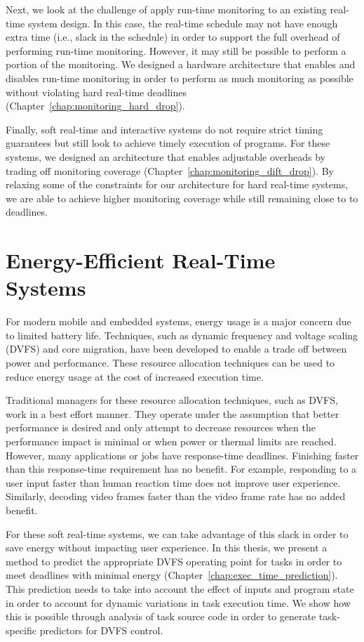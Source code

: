 Next, we look at the challenge of apply run-time monitoring to an existing
real-time system design. In this case, the real-time schedule may not have
enough extra time (i.e., slack in the schedule) in order to support the
full overhead of performing run-time monitoring. However, it may still be possible
to perform a portion of the monitoring. We designed a hardware architecture
that enables and disables run-time monitoring in order to perform as much
monitoring as possible without violating hard real-time deadlines
(Chapter~\ref{chap:monitoring_hard_drop}).

Finally, soft real-time and interactive systems do not require strict timing guarantees
but still look to achieve timely execution of programs. For these systems, we designed an
architecture that enables adjustable overheads by trading off monitoring coverage
(Chapter~\ref{chap:monitoring_dift_drop}). By relaxing some of the constraints
for our architecture for hard real-time systems, we are able to achieve higher
monitoring coverage while still remaining close to to deadlines.

\section{Energy-Efficient Real-Time Systems}
\label{sec:intro.energy}

For modern mobile and embedded systems, energy usage is a major concern due to
limited battery life. Techniques, such as dynamic frequency and voltage scaling
(DVFS) and core migration, have been developed to enable a trade off
between power and performance. These resource allocation techniques can be used
to reduce energy usage at the cost of increased execution time.

Traditional managers for these resource allocation techniques, such as DVFS,
work in a best effort manner. They operate under the assumption that better
performance is desired and only attempt to decrease resources when the
performance impact is minimal or when power or thermal limits are reached.
However, many applications or jobs have
response-time deadlines. Finishing faster than this response-time
requirement has no benefit. For example, responding to a user input faster than
human reaction time does not improve user experience. Similarly, decoding video
frames faster than the video frame rate has no added benefit. 

For these soft real-time systems, we can take advantage of this slack in order
to save energy without impacting user experience. In this thesis, we present a
method to predict the appropriate DVFS operating point for tasks in order to
meet deadlines with minimal energy (Chapter~\ref{chap:exec_time_prediction}).
This prediction needs to take into account the effect of inputs and program
state in order to account for dynamic variations in task execution time. We
show how this is possible through analysis of task source code in order
to generate task-specific predictors for DVFS control.

